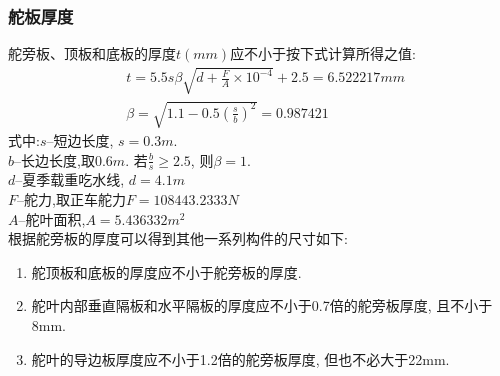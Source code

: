 \documentclass[a4paper,UTF8]{article}
\begin{document}
\subsubsection{舵板厚度}
舵旁板、顶板和底板的厚度$t(mm)$应不小于按下式计算所得之值:
\begin{equation}
\begin{split}
&	t=5.5s\beta\sqrt{d+\frac{F}{A}\times 10^{-4}}+2.5=6.522217mm\\
&	\beta=\sqrt{1.1-0.5(\frac{s}{b})^2}=0.987421
\end{split}
\end{equation}
式中:$s$--短边长度, $s=0.3m$.\\
$b$--长边长度,取$0.6m$. 若$\frac{b}{s}\ge2.5$, 则$\beta=1$.\\
$d$--夏季载重吃水线, $d=4.1m$\\
$F$--舵力,取正车舵力$F=108443.2333N$\\
$A$--舵叶面积,$A=5.436332 m^{2}$\\

根据舵旁板的厚度可以得到其他一系列构件的尺寸如下:
\begin{enumerate}
	\item 舵顶板和底板的厚度应不小于舵旁板的厚度.
	\item 舵叶内部垂直隔板和水平隔板的厚度应不小于0.7倍的舵旁板厚度, 且不小于8mm.
	\item 舵叶的导边板厚度应不小于1.2倍的舵旁板厚度, 但也不必大于22mm.
\end{enumerate}
\end{document}
